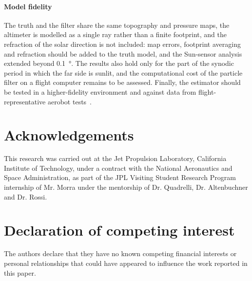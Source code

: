 \documentclass[preprint,12pt,a4paper]{elsarticle}
\begin{document}
\paragraph{Model fidelity}
The truth and the filter share the same topography and pressure maps, the altimeter is
modelled as a single ray rather than a finite footprint, and the refraction of the solar
direction is not included: map errors, footprint averaging and refraction should be added to
the truth model, and the Sun-sensor analysis extended beyond \SI{0.1}{\degree}.
The results also hold only for the part of the synodic period in which the far side is
sunlit, and the computational cost of the particle filter on a flight computer remains to be
assessed.
Finally, the estimator should be tested in a higher-fidelity environment and against data
from flight-representative aerobot tests~\cite{Hall2021,Izraelevitz2025}.

\section*{Acknowledgements}
This research was carried out at the Jet Propulsion Laboratory, California Institute of Technology, under a contract with the National Aeronautics and Space Administration, as part of the JPL Visiting Student Research Program internship of Mr. Morra under the mentorship of Dr. Quadrelli, Dr. Altenbuchner and Dr. Rossi.

\section*{Declaration of competing interest}
The authors declare that they have no known competing financial interests or personal
relationships that could have appeared to influence the work reported in this paper.

{\footnotesize


}
\end{document}
